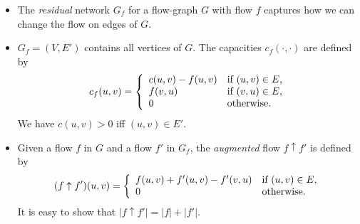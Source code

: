 \begin{itemize}
\item {} The \emph{residual} network $G_f$
  for a flow-graph $G$ with flow $f$ captures how we can change the
  flow on edges of $G$.
\item $G_f = (V,E')$ contains all vertices of $G$. The capacities
  $c_f(\cdot, \cdot)$ are defined by
  $$
    c_f(u,v) = \left\{\begin{array}{l l}
                 c(u,v) - f(u,v) & \text{if $(u,v) \in E$,} \\
                 f(v,u)          & \text{if $(v,u) \in E$,} \\
                 0               & \text{otherwise}.
               \end{array} \right.
  $$
  We have $c(u,v) > 0$ iff $(u,v) \in E'$.

\item Given a flow $f$ in $G$ and a flow $f'$ in $G_f$, the
  \emph{augmented} flow $f \uparrow f'$ is defined by
  $$
  (f \uparrow f')(u,v) = \left\{\begin{array}{l l}
                           f(u,v) + f'(u,v) - f'(v,u) & \text{if $(u,v) \in E$}, \\
                           0 & \text{otherwise}.
                         \end{array}\right.
  $$
  It is easy to show that $|f \uparrow f'| = |f| + |f'|$.
\end{itemize}

